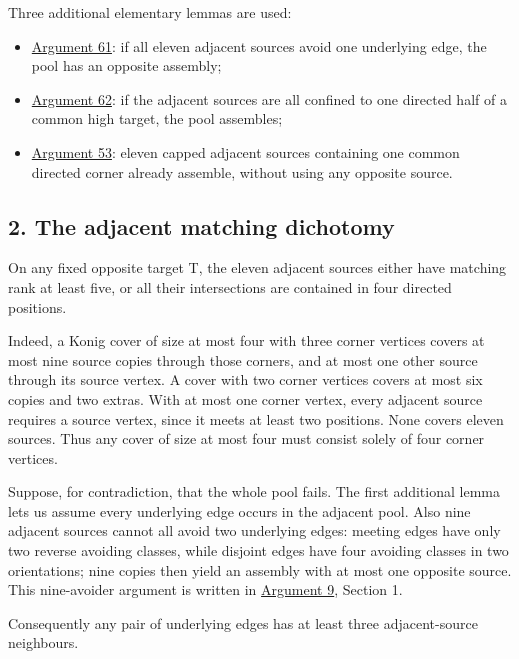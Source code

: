 \documentclass[
  10pt,
]{article}
\providecommand{\tightlist}{%
  \setlength{\itemsep}{0pt}\setlength{\parskip}{0pt}}
\begin{document}
Three additional elementary lemmas are used:

\begin{itemize}
\tightlist
\item
  \protect\hyperlink{arg-61}{Argument 61}: if all eleven adjacent
  sources avoid one underlying edge, the pool has an opposite assembly;
\item
  \protect\hyperlink{arg-62}{Argument 62}: if the adjacent sources are
  all confined to one directed half of a common high target, the pool
  assembles;
\item
  \protect\hyperlink{arg-53}{Argument 53}: eleven capped adjacent
  sources containing one common directed corner already assemble,
  without using any opposite source.
\end{itemize}

\hypertarget{the-adjacent-matching-dichotomy}{%
\subsection*{2. The adjacent matching
dichotomy}\label{the-adjacent-matching-dichotomy}}

On any fixed opposite target T, the eleven adjacent sources either have
matching rank at least five, or all their intersections are contained in
four directed positions.

Indeed, a Konig cover of size at most four with three corner vertices
covers at most nine source copies through those corners, and at most one
other source through its source vertex. A cover with two corner vertices
covers at most six copies and two extras. With at most one corner
vertex, every adjacent source requires a source vertex, since it meets
at least two positions. None covers eleven sources. Thus any cover of
size at most four must consist solely of four corner vertices.

Suppose, for contradiction, that the whole pool fails. The first
additional lemma lets us assume every underlying edge occurs in the
adjacent pool. Also nine adjacent sources cannot all avoid two
underlying edges: meeting edges have only two reverse avoiding classes,
while disjoint edges have four avoiding classes in two orientations;
nine copies then yield an assembly with at most one opposite source.
This nine-avoider argument is written in
\protect\hyperlink{arg-9}{Argument 9}, Section 1.

Consequently any pair of underlying edges has at least three
adjacent-source neighbours.
\end{document}
